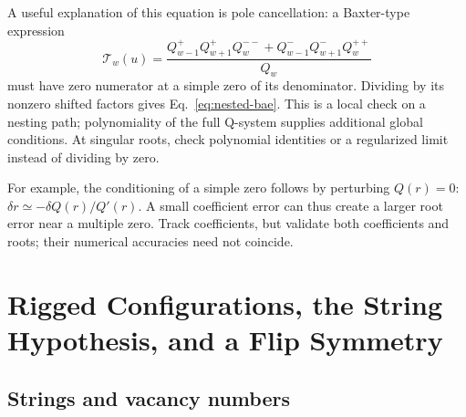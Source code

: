 \documentclass[11pt]{article}
\begin{document}
A useful explanation of this equation is pole cancellation: a Baxter-type
expression
\[
 \mathcal T_w(u)=\frac{
 Q_{w-1}^{+}Q_{w+1}^{+}Q_w^{--}
 +Q_{w-1}^{-}Q_{w+1}^{-}Q_w^{++}}{Q_w}
\]
must have zero numerator at a simple zero of its denominator. Dividing
by its nonzero shifted factors gives Eq.~\eqref{eq:nested-bae}.
This is a local check on a nesting path; polynomiality of the full
Q-system supplies additional global conditions. At singular roots,
check polynomial identities or a regularized limit instead of dividing
by zero.

For example, the conditioning of a simple zero follows by perturbing
$Q(r)=0$: $\delta r\simeq-\delta Q(r)/Q'(r)$.
A small coefficient error can thus create a larger root error near a
multiple zero. Track coefficients, but validate both coefficients and
roots; their numerical accuracies need not coincide.

\section{Rigged Configurations, the String Hypothesis, and a Flip Symmetry}
\label{sec:rc}

\subsection{Strings and vacancy numbers}
\end{document}
